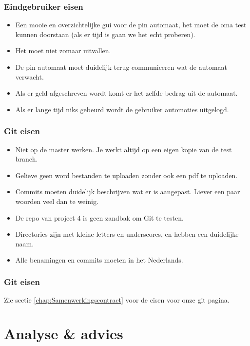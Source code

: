 \documentclass{article}
\begin{document}
\subsubsection{Eindgebruiker eisen}
\begin{itemize}
        \item Een mooie en overzichtelijke gui voor de pin automaat, het moet de oma test kunnen doorstaan (als er tijd is gaan we het echt proberen).
        \item Het moet niet zomaar uitvallen.
        \item De pin automaat moet duidelijk terug communiceren wat de automaat verwacht.
        \item Als er geld afgeschreven wordt komt er het zelfde bedrag uit de automaat.
        \item Als er lange tijd niks gebeurd wordt de gebruiker automoties uitgelogd.
\end{itemize}

\subsubsection{Git eisen}
\begin{itemize}
        \item Niet op de master werken. Je werkt altijd op een eigen kopie van de test branch.
        \item Gelieve geen word bestanden te uploaden zonder ook een pdf te uploaden.
        \item Commits moeten duidelijk beschrijven wat er is aangepast. Liever een paar woorden veel dan te weinig.
        \item De repo van project 4 is geen zandbak om Git te testen.
        \item Directories zijn met kleine letters en underscores, en hebben een duidelijke naam.
        \item Alle benamingen en commits moeten in het Nederlands.
\end{itemize}

\subsubsection{Git eisen}
Zie sectie \ref{chap:Samenwerkingscontract} voor de eisen voor onze git pagina.

\section{Analyse \& advies}
\end{document}
